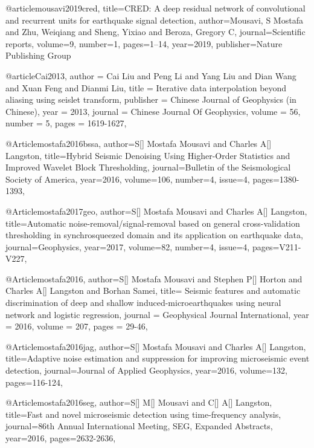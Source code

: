 @article{mousavi2019cred,
  title={CRED: A deep residual network of convolutional and recurrent units for earthquake signal detection},
  author={Mousavi, S Mostafa and Zhu, Weiqiang and Sheng, Yixiao and Beroza, Gregory C},
  journal={Scientific reports},
  volume={9},
  number={1},
  pages={1--14},
  year={2019},
  publisher={Nature Publishing Group}
}

@article{Cai2013,
 author     = {Cai Liu and 
               Peng Li and 
               Yang Liu and 
               Dian Wang and 
               Xuan Feng and 
               Dianmi Liu},
 title      = {Iterative data interpolation beyond aliasing using seislet 
               transform},
 publisher  = {Chinese Journal of Geophysics (in Chinese)},
 year       = {2013},
 journal    = {Chinese Journal Of Geophysics},
 volume     = {56},
 number     = {5},
 pages      = {1619-1627},
}


@Article{mostafa2016bssa,
  author={S[] Mostafa Mousavi and Charles A[] Langston},
  title={Hybrid Seismic Denoising Using Higher-Order Statistics and Improved Wavelet Block Thresholding},
  journal={Bulletin of the Seismological Society of America},
  year=2016,
  volume=106,
  number=4,
  issue=4,
  pages={1380-1393},
}

@Article{mostafa2017geo,
  author={S[] Mostafa Mousavi and Charles A[] Langston},
  title={Automatic noise-removal/signal-removal based on general cross-validation thresholding in synchrosqueezed domain and its application on earthquake data},
  journal={Geophysics},
  year=2017,
  volume=82,
  number=4,
  issue=4,
  pages={V211-V227},
}

@Article{mostafa2016,
  author={S[] Mostafa Mousavi and Stephen P[] Horton and Charles A[] Langston and Borhan Samei},
  title={ Seismic features and automatic discrimination of deep and shallow induced-microearthquakes using neural network and logistic regression},
  journal = 	 {Geophysical Journal International},
  year = 	 2016,
  volume =	 207,
  pages =	 {29-46},
}



@Article{mostafa2016jag,
  author={S[] Mostafa Mousavi and Charles A[] Langston},
  title={Adaptive noise estimation and suppression for improving microseismic event detection},
  journal={Journal of Applied Geophysics},
  year=2016,
  volume=132,
  pages={116-124},
}

  @Article{mostafa2016seg,
  author={S[] M[] Mousavi and C[] A[] Langston},
  title={Fast and novel microseismic detection using time-frequency analysis},
  journal={86th Annual International Meeting, SEG, Expanded Abstracts},
  year=2016,
  pages={2632-2636},
}


